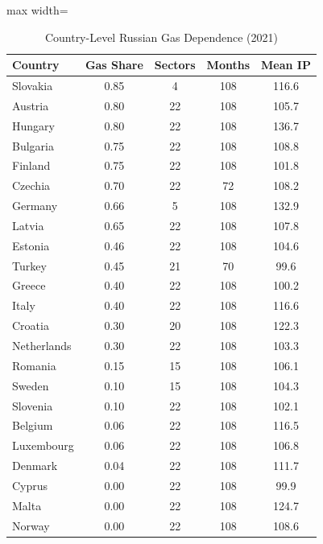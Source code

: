 \documentclass[12pt]{article}
\begin{document}
\begin{table}[H]
\centering
\caption{Country-Level Russian Gas Dependence (2021)}
\label{tab:countries}
\begin{threeparttable}
\begin{adjustbox}{max width=\textwidth}
\begin{tabular}{lcccc}
\toprule
Country & Gas Share & Sectors & Months & Mean IP \\
\midrule
Slovakia & 0.85 & 4 & 108 & 116.6 \\
Austria & 0.80 & 22 & 108 & 105.7 \\
Hungary & 0.80 & 22 & 108 & 136.7 \\
Bulgaria & 0.75 & 22 & 108 & 108.8 \\
Finland & 0.75 & 22 & 108 & 101.8 \\
Czechia & 0.70 & 22 & 72 & 108.2 \\
Germany & 0.66 & 5 & 108 & 132.9 \\
Latvia & 0.65 & 22 & 108 & 107.8 \\
Estonia & 0.46 & 22 & 108 & 104.6 \\
Turkey & 0.45 & 21 & 70 & 99.6 \\
Greece & 0.40 & 22 & 108 & 100.2 \\
Italy & 0.40 & 22 & 108 & 116.6 \\
Croatia & 0.30 & 20 & 108 & 122.3 \\
Netherlands & 0.30 & 22 & 108 & 103.3 \\
Romania & 0.15 & 15 & 108 & 106.1 \\
Sweden & 0.10 & 15 & 108 & 104.3 \\
Slovenia & 0.10 & 22 & 108 & 102.1 \\
Belgium & 0.06 & 22 & 108 & 116.5 \\
Luxembourg & 0.06 & 22 & 108 & 106.8 \\
Denmark & 0.04 & 22 & 108 & 111.7 \\
Cyprus & 0.00 & 22 & 108 & 99.9 \\
Malta & 0.00 & 22 & 108 & 124.7 \\
Norway & 0.00 & 22 & 108 & 108.6 \\
\bottomrule
\end{tabular}
\end{adjustbox}
\begin{tablenotes}[flushleft]
\small

\end{tablenotes}
\end{threeparttable}
\end{table}
\end{document}
